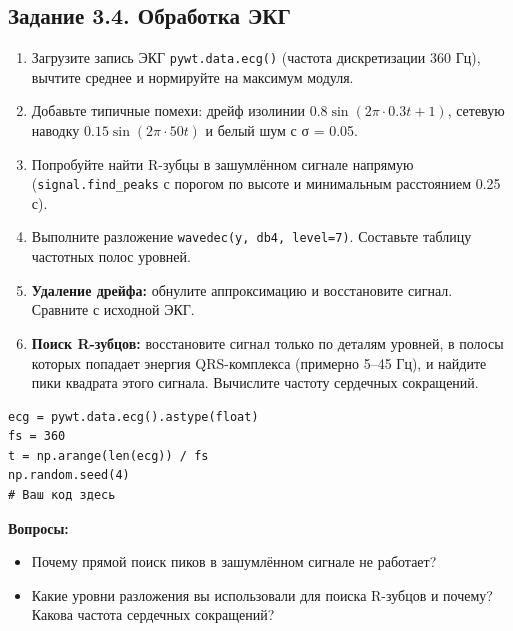 \documentclass[12pt,a4paper,openany]{book}
\providecommand{\tightlist}{\setlength{\itemsep}{0pt}\setlength{\parskip}{0pt}}
\begin{document}
\subsection*{Задание 3.4. Обработка ЭКГ}

\begin{enumerate}
\def\labelenumi{\arabic{enumi}.}
\tightlist
\item
  Загрузите запись ЭКГ \texttt{pywt.\allowbreak{}data.\allowbreak{}ecg(\allowbreak{})} (частота дискретизации 360 Гц), вычтите среднее и нормируйте на максимум модуля.
\item
  Добавьте типичные помехи: дрейф изолинии \(0.8\sin(2\pi\cdot 0.3t + 1)\), сетевую наводку \(0.15\sin(2\pi\cdot 50t)\) и белый шум с σ = 0.05.
\item
  Попробуйте найти R-зубцы в зашумлённом сигнале напрямую (\texttt{signal.\allowbreak{}find\_\allowbreak{}peaks} с порогом по высоте и минимальным расстоянием 0.25 с).
\item
  Выполните разложение \texttt{wavedec(\allowbreak{}y,\allowbreak{}\ \textquotesingle{}\allowbreak{}db4\textquotesingle{}\allowbreak{},\allowbreak{}\ level=\allowbreak{}7)}. Составьте таблицу частотных полос уровней.
\item
  \textbf{Удаление дрейфа:} обнулите аппроксимацию и восстановите сигнал. Сравните с исходной ЭКГ.
\item
  \textbf{Поиск R-зубцов:} восстановите сигнал только по деталям уровней, в полосы которых попадает энергия QRS-комплекса (примерно 5--45 Гц), и найдите пики квадрата этого сигнала. Вычислите частоту сердечных сокращений.
\end{enumerate}

\begin{Verbatim}[fontsize=\small, breaklines, breakanywhere, frame=single, framesep=2mm]
ecg = pywt.data.ecg().astype(float)
fs = 360
t = np.arange(len(ecg)) / fs
np.random.seed(4)
# Ваш код здесь
\end{Verbatim}

\textbf{Вопросы:}

\begin{itemize}
\tightlist
\item
  Почему прямой поиск пиков в зашумлённом сигнале не работает?
\item
  Какие уровни разложения вы использовали для поиска R-зубцов и почему? Какова частота сердечных сокращений?
\end{itemize}
\end{document}

